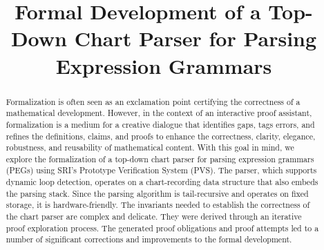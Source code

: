 \documentclass[sigplan,10pt,anonymous,review]{acmart}\settopmatter{printfolios=true,printccs=false,printacmref=false}
\begin{document}
\title{Formal Development of a Top-Down Chart Parser for Parsing Expression Grammars}
\author{  
  \and
}

\maketitle


\begin{abstract}
  Formalization is often seen as an exclamation point 
   certifying the correctness of a mathematical development.  However, in
  the context of an interactive proof assistant, formalization is a medium for a
  creative dialogue that identifies gaps, tags errors, and refines the
  definitions, claims, and proofs to enhance the correctness, clarity,
  elegance, robustness,
  and reusability of mathematical content.  With this goal in
  mind, we explore the formalization of a top-down chart parser for
  parsing expression grammars (PEGs) using SRI's Prototype
  Verification System (PVS).  The parser, which supports dynamic loop
  detection, operates on a chart-recording data structure that also embeds the
  parsing stack.  Since the parsing algorithm is tail-recursive and
  operates on fixed storage, it is hardware-friendly.  The invariants
  needed to establish the correctness of the chart parser are complex
  and delicate.  They were derived through an iterative proof
  exploration process.  The generated proof obligations and proof
  attempts led to a number of significant corrections and improvements
  to the formal development.
\end{abstract}




\end{document}
